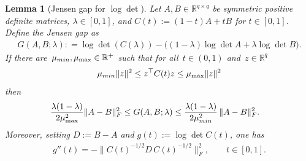 \documentclass[10pt,a4paper]{amsart}
\newtheorem{lem}{Lemma}
\def\bR{\mathbb{R}}
\def\min{{\rm min}}
\begin{document}
\begin{lem}[Jensen gap for $\log\det$]\label{lem:jensen_gap_logdet}
Let $A,B\in\bR^{q\times q}$ be symmetric positive definite matrices, $\lambda \in [0,1]$, and $C(t):=(1-t)A+tB$ for $t\in[0,1]$.
 Define the Jensen gap as
\begin{align}
    G(A,B;\lambda) : = \log\det\left(C(\lambda)\right)
-\Big((1-\lambda)\log\det A+\lambda\log\det B\Big).
\end{align}
If there are~$\mu_{\min},\mu_{\max}\in\mathbb{R}^+$ such that for all~$t \in (0,1)$ and~$ z \in \mathbb{R}^q$
\begin{align}\label{equ:hypo_jensen_gap}
  \mu_{\min} \|z\|^2 \leq   z^{\top} C(t) z \leq \mu_{\max} \|z\|^2
\end{align}
then
\begin{align}\label{equ:jensen_gap}
\frac{\lambda(1-\lambda)}{2\mu_{\max}^2}  & \|A-B\|_F^2 \le
 G(A,B;\lambda)
 \leq \frac{\lambda(1-\lambda)}{2\mu_{\min}^2}\,\|A-B\|_F^2.
\end{align}
Moreover, setting $D:=B-A$ and $g(t):=\log\det C(t)$, one has
\begin{align}\label{eq:gpp_logdet}
g''(t)=-\bigl\|C(t)^{-1/2}D\,C(t)^{-1/2}\bigr\|_F^2,\qquad t\in[0,1].
\end{align}
\end{lem}
\end{document}
